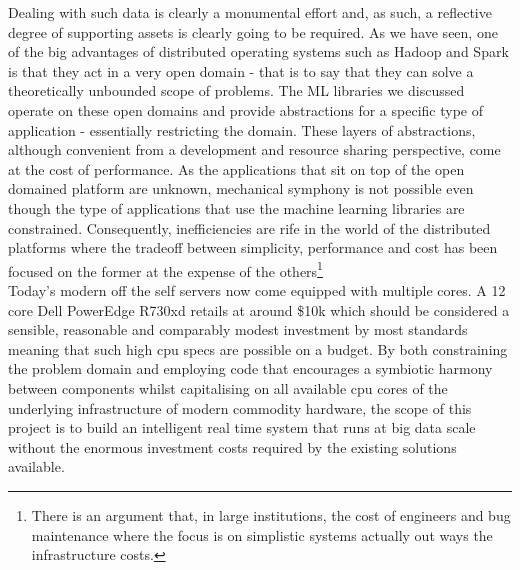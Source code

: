 \documentclass[a4paper,11pt]{scrreprt}
\begin{document}
Dealing with such data is clearly a monumental effort and, as such, a reflective degree of supporting assets is clearly going to be required. As we have seen, one of the big advantages of distributed operating systems such as Hadoop and Spark is that they act in a very open domain - that is to say that they can solve a theoretically unbounded scope of problems. The ML libraries we discussed operate on these open domains and provide abstractions for a specific type of application - essentially restricting the domain. These layers of abstractions, although convenient from a development and resource sharing perspective, come at the cost of performance. As the applications that sit on top of the open domained platform are unknown, mechanical symphony is not possible even though the type of applications that use the machine learning libraries are constrained. Consequently, inefficiencies are rife in the world of the distributed platforms where the tradeoff between simplicity, performance and cost has been focused on the former at the expense of the others\footnote{There is an argument that, in large institutions, the cost of engineers and bug maintenance where the focus is on simplistic systems actually out ways the infrastructure costs.}\\

Today's modern off the self servers now come equipped with multiple cores. A 12 core Dell PowerEdge R730xd retails at around \$10k which should be considered a sensible, reasonable and comparably modest investment by most standards meaning that such high \acrshort{cpu} specs are possible on a budget. By both constraining the problem domain and employing code that encourages a symbiotic harmony between components whilst capitalising on all available \acrshort{cpu} cores of the underlying infrastructure of modern commodity hardware, the scope of this project is to build an intelligent real time system that runs at big data scale without the enormous investment costs required by the existing solutions available. 
\end{document}
